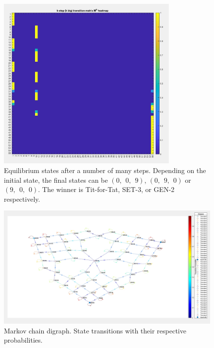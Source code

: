 \documentclass[12pt]{article}
\begin{document}
\begin{figure}[h!]
    \centering
    \includegraphics[width=0.8\textwidth]{media/C.jpg}
    \caption{Equilibrium states after a number of many steps. Depending on the initial state, the final states can be $(0,\ \ 0,\ \ 9)$, $(0,\ \ 9,\ \ 0)$ or $(9,\ \ 0,\ \ 0)$. The winner is Tit-for-Tat, SET-3, or GEN-2 respectively.}
    \label{fig:myimage}
\end{figure}

\begin{figure}
    \centering
    \includegraphics[width=1\textwidth]{media/D.jpg}
    \caption{Markov chain digraph. State transitions with their respective probabilities.}
    \label{fig:myimage}
\end{figure}
\end{document}
